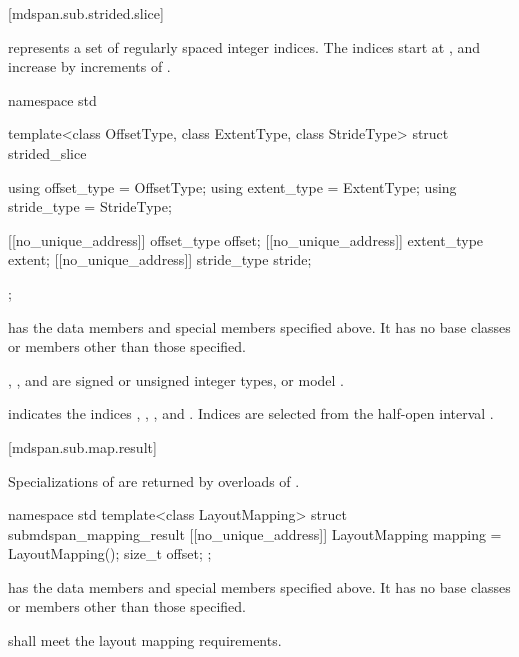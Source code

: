 [mdspan.sub.strided.slice]{}

\pnum
{} represents a set of
 regularly spaced integer indices.
The indices start at , and
increase by increments of .

%
\begin{codeblock}
namespace std {
  template<class OffsetType, class ExtentType, class StrideType>
  struct strided_slice {
    using offset_type = OffsetType;
    using extent_type = ExtentType;
    using stride_type = StrideType;

    [[no_unique_address]] offset_type offset{};
    [[no_unique_address]] extent_type extent{};
    [[no_unique_address]] stride_type stride{};
  };
}
\end{codeblock}

\pnum
{} has the data members and special members specified above.
It has no base classes or members other than those specified.

\pnum
\mandates
{}, , and 
are signed or unsigned integer types, or
model .
\begin{note}
indicates the indices , , , and .
Indices are selected from the half-open interval .
\end{note}

[mdspan.sub.map.result]{}

\pnum
Specializations of 
are returned by overloads of .

%
\begin{codeblock}
namespace std {
  template<class LayoutMapping>
  struct submdspan_mapping_result {
    [[no_unique_address]] LayoutMapping mapping = LayoutMapping();
    size_t offset{};
  };
}
\end{codeblock}

\pnum
{} has
the data members and special members specified above.
It has no base classes or members other than those specified.

\pnum
{} shall meet
the layout mapping requirements.


